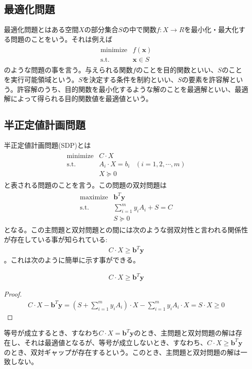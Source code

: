 \subsection{最適化問題}
最適化問題とはある空間$X$の部分集合$S$の中で関数$f: X \rightarrow R$を最小化・最大化する問題のことをいう。それは例えば
\begin{align*}
  \begin{array}{ll}
    \text{minimize} & f(\mathbf{x}) \\
    \text{s.t.}     & \mathbf{x} \in S
  \end{array}
\end{align*}
のような問題の事を言う。与えられる関数$f$のことを目的関数といい、$S$のことを実行可能領域という。$S$を決定する条件を制約といい、$S$の要素を許容解という。許容解のうち、目的関数を最小化するような解のことを最適解といい、最適解によって得られる目的関数値を最適値という。

\subsection{半正定値計画問題}
半正定値計画問題(SDP)とは
\begin{align*}
  \begin{array}{lll}
    \mathrm{minimize} & C \cdot X \\
    \mathrm{s.t.}     & A_i \cdot X = b_i & (i = 1, 2, \cdots, m) \\
                      & X \succeq 0
  \end{array}
\end{align*}
と表される問題のことを言う。この問題の双対問題は
\begin{align*}
  \begin{array}{lll}
    \mathrm{maximize} & \mathbf{b}^T \mathbf{y} \\
    \mathrm{s.t.}     & \displaystyle{\sum_{i = 1}^m y_i A_i + S = C} \\
                      & S \succeq 0
  \end{array}
\end{align*}
となる。この主問題と双対問題との間には次のような弱双対性と言われる関係性が存在している事が知られている:
\begin{align*}
  C \cdot X \geq \mathbf{b}^T \mathbf{y}
\end{align*}
。これは次のように簡単に示す事ができる。
\begin{theorem*}
  \begin{align*}
    C \cdot X \geq \mathbf{b}^T \mathbf{y}
  \end{align*}
\end{theorem*}
\begin{proof}
  \begin{align*}
    C \cdot X - \mathbf{b}^T \mathbf{y} = (S + \displaystyle{\sum_{i = 1}^m y_i A_i}) \cdot X - \displaystyle{\sum_{i = 1}^m y_i A_i \cdot X} = S \cdot X \geq 0
  \end{align*}
\end{proof}
等号が成立するとき、すなわち$C \cdot X = \mathbf{b}^T \mathbf{y}$のとき、主問題と双対問題の解は存在し、それは最適値となるが、等号が成立しないとき、すなわち、$C \cdot X \geq \mathbf{b}^T \mathbf{y}$のとき、双対ギャップが存在するという。このとき、主問題と双対問題の解は一致しない。

